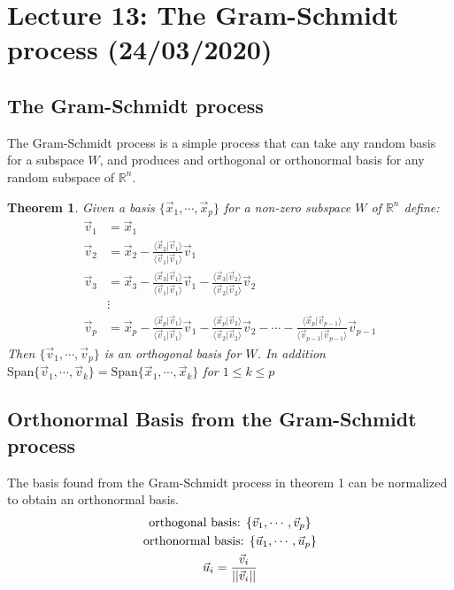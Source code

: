 \documentclass[11pt, a4paper]{article}
\newcommand*{\R}{\ensuremath{\mathbb{R}}}
\newtheorem{theorem}{Theorem}
\begin{document}
\setcounter{section}{12}
\section{Lecture 13: The Gram-Schmidt process (24/03/2020)}
\subsection{The Gram-Schmidt process}
The Gram-Schmidt process is a simple process that can take any random basis for a subspace $W$, and produces and orthogonal or orthonormal basis for any random subspace of $\R^n$.

\begin{theorem}
  Given a basis $\{\vec{x}_1, \cdots, \vec{x}_p \}$ for a non-zero subspace $W$ of $\R^n$ define:
  \begin{align*}
    \vec{v}_1 &= \vec{x}_1\\
    \vec{v}_2 &= \vec{x}_2 - \frac{\langle \vec{x}_2 | \vec{v}_1 \rangle}{\langle \vec{v}_1 | \vec{v}_1 \rangle}\vec{v}_1\\
    \vec{v}_3 &= \vec{x}_3 - \frac{\langle \vec{x}_3 | \vec{v}_1 \rangle}{\langle \vec{v}_1 | \vec{v}_1 \rangle}\vec{v}_1 - \frac{\langle \vec{x}_3 | \vec{v}_2 \rangle}{\langle \vec{v}_2 | \vec{v}_2 \rangle}\vec{v}_2\\
    &\vdots\\
    \vec{v}_p &= \vec{x}_p - \frac{\langle \vec{x}_p | \vec{v}_1 \rangle}{\langle \vec{v}_1 | \vec{v}_1 \rangle}\vec{v}_1 - \frac{\langle \vec{x}_p | \vec{v}_2 \rangle}{\langle \vec{v}_2 | \vec{v}_2 \rangle}\vec{v}_2 - \cdots - \frac{\langle \vec{x}_p | \vec{v}_{p-1} \rangle}{\langle \vec{v}_{p-1} | \vec{v}_{p-1} \rangle}\vec{v}_{p-1}
  \end{align*}
  Then $\{\vec{v}_1, \cdots, \vec{v}_p \}$ is an orthogonal basis for $W$. In addition $\text{Span}\{\vec{v}_1, \cdots, \vec{v}_k\} = \text{Span}\{\vec{x}_1, \cdots, \vec{x}_k \}$ for $1 \leq k \leq p$
\end{theorem}

\subsection{Orthonormal Basis from the Gram-Schmidt process}
The basis found from the Gram-Schmidt process in theorem 1 can be normalized to obtain an orthonormal basis.
\begin{gather}
  \text{orthogonal basis: } \{\vec{v}_1, \cdots, \vec{v}_p\} \notag\\
  \text{orthonormal basis: } \{\vec{u}_1, \cdots, \vec{u}_p\} \notag\\
  \vec{u}_i = \frac{\vec{v}_i}{||\vec{v}_i||}
\end{gather}
\end{document}
